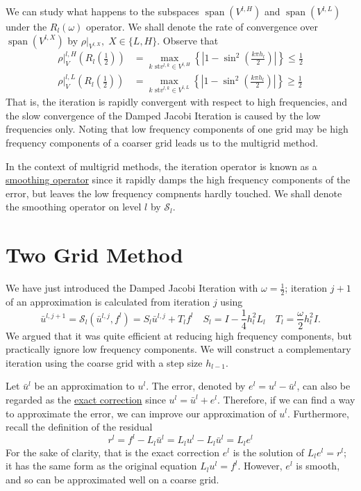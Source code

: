 \documentclass[a4paper,10pt,oneside]{book}
\theoremstyle{plain}%
\theoremstyle{definition}
\theoremstyle{remark}
\DeclareMathOperator{\spn}{span}
\newcommand{\calS}{\mathcal{S}}
\newcommand{\hl}{h_l} %
\newcommand{\fl}{f^l}
\newcommand{\ul}{u^l}
\newcommand{\bul}{\bar{u}^l}
\newcommand{\Ll}{L_l}
\begin{document}
We can study what happens to the subspaces $\spn(V^{l,H})$ and $\spn(V^{l,L})$
under the $R_l(\omega)$ operator.
We shall denote the rate of convergence over $\spn(V^{l,X})$ by
$\rho|_{V^{l,X}},\; X\in\{L,H\}$. Observe that
\begin{align}
 \rho|_V^{l,H}\left(R_l\left(\frac{1}{2}\right)\right) &= \max_{k\text{ st
}v^{l,k}\in V^{l,H}}\left\{\left|1-\sin^2\left(\frac{k\pi
\hl}{2}\right)\right|\right\} \leq\frac{1}{2}\\
 \rho|_V^{l,L}\left(R_l\left(\frac{1}{2}\right)\right) &= \max_{k\text{ st
}v^{l,k}\in V^{l,L}}\left\{\left|1-\sin^2\left(\frac{k\pi
\hl}{2}\right)\right|\right\} \geq\frac{1}{2}
\end{align}
That is, the iteration is rapidly convergent with respect to high frequencies,
and the slow convergence of the Damped Jacobi Iteration is caused by the low
frequencies only. Noting that low frequency components of one grid may be high
frequency components of a coarser grid leads us to the multigrid method.

In the context of multigrid methods, the iteration operator is known as a
\underline{smoothing operator} since it rapidly damps the high frequency
components of the error, but leaves the low frequency compnents hardly touched.
We shall denote the smoothing operator on level $l$ by $\calS_l$.

\section{Two Grid Method}
We have just introduced the Damped Jacobi Iteration with $\omega=\frac{1}{2}$;
iteration $j+1$ of an approximation is calculated from iteration $j$ using
\begin{equation}
 \bar{u}^{l,j+1}=\calS_l(\bar{u}^{l,j}, \fl)=S_l\bar{u}^{l,j}+T_l\fl\quad
S_l=I-\frac{1}{4}h_l^2L_l\quad T_l=\frac{\omega}{2}\hl^{2}I.
\end{equation}
We argued that it was quite efficient at reducing high frequency components, but
practically ignore low frequency components. We will construct a complementary
iteration using the coarse grid with a step size $h_{l-1}$.

Let $\bul$ be an approximation to $\ul$. The error, denoted by $e^l=\ul-\bul$,
can also be regarded as the \underline{exact correction} since $\ul=\bul+e^l$.
Therefore, if we can find a way to approximate the error, we can improve our
approximation of $\ul$. Furthermore, recall the definition of the residual
\begin{equation}
 r^l=\fl-\Ll\bul=\Ll\ul-\Ll\bul=\Ll e^l
\end{equation}
For the sake of clarity, that is the exact correction $e^l$ is the solution of
$\Ll e^l=r^l$; it has the same form as the original equation $\Ll\ul=\fl$.
However, $e^l$ is smooth, and so can be approximated well on a coarse grid.
\end{document}
